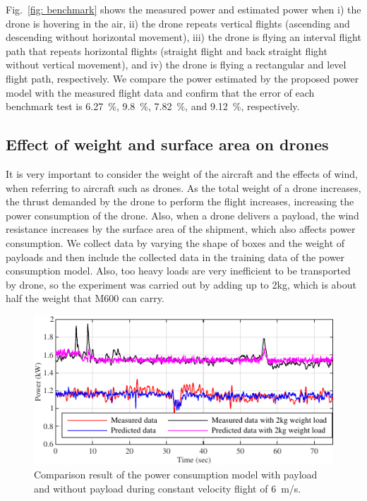 \documentclass[journal]{./template/IEEEtran}
\begin{document}
Fig.~\ref{fig: benchmark} shows the measured power and estimated power when i) the drone is hovering in the air, ii) the drone repeats vertical flights (ascending and descending without horizontal movement), iii) the drone is flying an interval flight path that repeats horizontal flights (straight flight and back straight flight without vertical movement), and iv) the drone is flying a rectangular and level flight path, respectively. 
We compare the power estimated by the proposed power model with the measured flight data and confirm that the error of each benchmark test is 6.27~\%, 9.8~\%, 7.82~\%, and 9.12~\%, respectively.





\subsection{Effect of weight and surface area on drones}
It is very important to consider the weight of the aircraft and the effects of wind, when referring to aircraft such as drones.
As the total weight of a drone increases, the thrust demanded by the drone to perform the flight increases, increasing the power consumption of the drone. 
Also, when a drone delivers a payload, the wind resistance increases by the surface area of the shipment, which also affects power consumption.
We collect data by varying the shape of boxes and the weight of payloads and then include the collected data in the training data of the power consumption model.
Also, too heavy loads are very inefficient to be transported by drone, so the experiment was carried out by adding up to 2kg, which is about half the weight that M600 can carry.

\begin{figure}[ht]
\centering\includegraphics[scale=1.0]{fig9/compare_weight8x4.pdf}
\caption{Comparison result of the power consumption model with payload and without payload during constant velocity flight of 6~m/s.}
\label{fig: Model_weight}
\end{figure}
\end{document}
